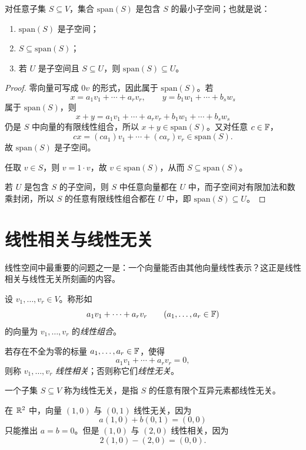 \begin{proposition}
对任意子集 $S\subseteq V$，集合 $\mathrm{span}(S)$ 是包含 $S$ 的最小子空间；也就是说：
\begin{enumerate}[label=\textnormal{(\arabic*)}]
  \item $\mathrm{span}(S)$ 是子空间；
  \item $S\subseteq \mathrm{span}(S)$；
  \item 若 $U$ 是子空间且 $S\subseteq U$，则 $\mathrm{span}(S)\subseteq U$。
\end{enumerate}
\end{proposition}

\begin{proof}
零向量可写成 $0v$ 的形式，因此属于 $\mathrm{span}(S)$。若
\[
x=a_1v_1+\cdots+a_rv_r,\qquad y=b_1w_1+\cdots+b_sw_s
\]
属于 $\mathrm{span}(S)$，则
\[
x+y=a_1v_1+\cdots+a_rv_r+b_1w_1+\cdots+b_sw_s
\]
仍是 $S$ 中向量的有限线性组合，所以 $x+y\in\mathrm{span}(S)$。又对任意 $c\in\mathbb{F}$，
\[
cx=(ca_1)v_1+\cdots+(ca_r)v_r\in\mathrm{span}(S).
\]
故 $\mathrm{span}(S)$ 是子空间。

任取 $v\in S$，则 $v=1\cdot v$，故 $v\in\mathrm{span}(S)$，从而 $S\subseteq\mathrm{span}(S)$。

若 $U$ 是包含 $S$ 的子空间，则 $S$ 中任意向量都在 $U$ 中，而子空间对有限加法和数乘封闭，所以 $S$ 的任意有限线性组合都在 $U$ 中，即 $\mathrm{span}(S)\subseteq U$。
\end{proof}

\section{线性相关与线性无关}

线性空间中最重要的问题之一是：一个向量能否由其他向量线性表示？这正是线性相关与线性无关所刻画的内容。

\begin{definition}
设 $v_1,\dots,v_r\in V$。称形如
\[
a_1v_1+\cdots+a_rv_r\qquad (a_1,\dots,a_r\in\mathbb{F})
\]
的向量为 $v_1,\dots,v_r$ 的\emph{线性组合}。

若存在不全为零的标量 $a_1,\dots,a_r\in\mathbb{F}$，使得
\[
a_1v_1+\cdots+a_rv_r=0,
\]
则称 $v_1,\dots,v_r$ \emph{线性相关}；否则称它们\emph{线性无关}。

一个子集 $S\subseteq V$ 称为线性无关，是指 $S$ 的任意有限个互异元素都线性无关。
\end{definition}

\begin{example}
在 $\mathbb{R}^2$ 中，向量 $(1,0)$ 与 $(0,1)$ 线性无关，因为
\[
a(1,0)+b(0,1)=(0,0)
\]
只能推出 $a=b=0$。但是 $(1,0)$ 与 $(2,0)$ 线性相关，因为
\[
2(1,0)-(2,0)=(0,0).
\]
\end{example}

